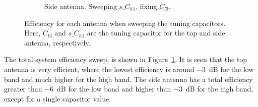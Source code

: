 \begin{figure}[htbp]
\begin{subfigure}{0.49\linewidth}
        \caption{Side antenna. Sweeping $s\_C_{h1}$, fixing $C_{l3}$.}
    \end{subfigure}
    \caption{Efficiency for each antenna when sweeping the tuning capacitors. Here, $C_{l3}$ and $s\_C_{h1}$ are the tuning capacitor for the top and side antenna, respectively.}
    \label{fig:eff_sol3}
\end{figure}

The total system efficiency sweep, is shown in Figure~\ref{fig:eff_sol3}. It is seen that the top antenna is very efficient, where the lowest efficiency is around \SI{-3}{dB} for the low band and much higher for the high band. The side antenna has a total efficiency greater than \SI{-6}{dB} for the low band and higher than \SI{-3}{dB} for the high band, except for a single capacitor value.



